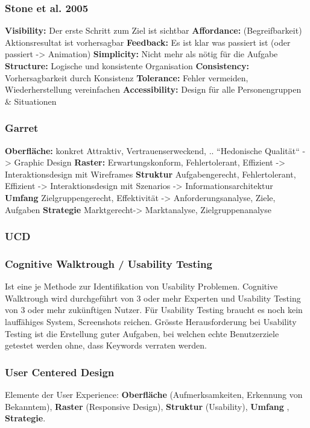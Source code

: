 \begin{multicols*}{4}
\subsubsection{Stone et al. 2005}
\textbf{Visibility:} Der erste Schritt zum Ziel ist sichtbar
\textbf{Affordance:} (Begreifbarkeit) Aktionsresultat ist vorhersagbar
\textbf{Feedback:} Es ist klar was passiert ist (oder passiert -> Animation)
\textbf{Simplicity:} Nicht mehr als nötig für die Aufgabe
\textbf{Structure:} Logische und konsistente Organisation
\textbf{Consistency:} Vorhersagbarkeit durch Konsistenz
\textbf{Tolerance:} Fehler vermeiden, Wiederherstellung vereinfachen
\textbf{Accessibility:} Design für alle Personengruppen \& Situationen
\subsubsection{Garret}
\textbf{Oberfläche:} konkret Attraktiv, Vertrauenserweckend, .. “Hedonische Qualität“
-> Graphic Design
\textbf{Raster:} Erwartungskonform, Fehlertolerant, Effizient -> Interaktionsdesign mit Wireframes
\textbf{Struktur} Aufgabengerecht, Fehlertolerant, Effizient
-> Interaktionsdesign mit Szenarios -> Informationsarchitektur
\textbf{Umfang} Zielgruppengerecht, Effektivität -> Anforderungsanalyse, Ziele, Aufgaben
\textbf{Strategie}  Marktgerecht-> Marktanalyse, Zielgruppenanalyse
\subsubsection{UCD}
\subsubsection{Cognitive Walktrough / Usability Testing}
\tiny Ist eine je Methode zur Identifikation von Usability Problemen. Cognitive 
Walktrough wird durchgeführt von 3 oder mehr Experten und Usability Testing 
von 3 oder mehr zukünftigen Nutzer. Für Usability Testing braucht es noch kein 
lauffähiges System, Screenshots reichen. Grösste Herausforderung bei Usability 
Testing ist die Erstellung guter Aufgaben, bei welchen echte Benutzerziele getestet 
werden ohne, dass Keywords verraten werden.
\subsubsection{User Centered Design}
Elemente der User Experience: \textbf{Oberfläche} (Aufmerksamkeiten, 
Erkennung von Bekanntem), \textbf{Raster} (Responsive Design), \textbf{Struktur} (Usability), 
\textbf{Umfang} , \textbf{Strategie}.


\end{multicols*}
